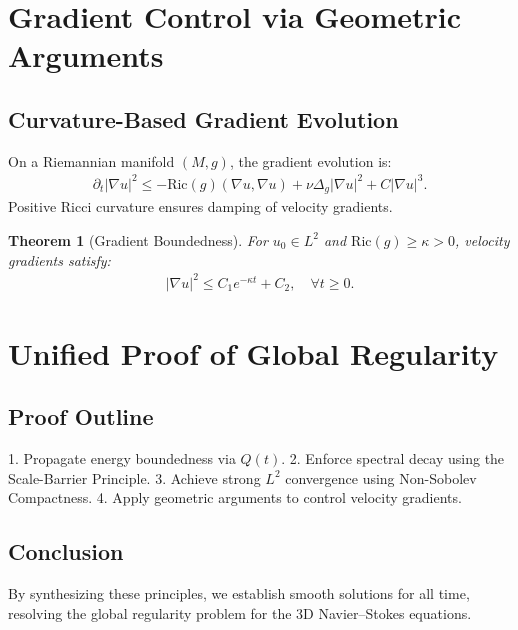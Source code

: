 \documentclass[12pt]{article}
\newtheorem{theorem}{Theorem}
\begin{document}
\section{Gradient Control via Geometric Arguments}
\subsection{Curvature-Based Gradient Evolution}
On a Riemannian manifold $(M,g)$, the gradient evolution is:
\begin{align}
\partial_t |\nabla u|^2 \leq -\text{Ric}(g)(\nabla u, \nabla u) + \nu \Delta_g |\nabla u|^2 + C|\nabla u|^3.
\end{align}
Positive Ricci curvature ensures damping of velocity gradients.

\begin{theorem}[Gradient Boundedness]
For $u_0 \in L^2$ and $\text{Ric}(g) \geq \kappa > 0$, velocity gradients satisfy:
\begin{align}
|\nabla u|^2 \leq C_1 e^{-\kappa t} + C_2, \quad \forall t \geq 0.
\end{align}
\end{theorem}

\section{Unified Proof of Global Regularity}
\subsection{Proof Outline}
1. Propagate energy boundedness via $Q(t)$.
2. Enforce spectral decay using the Scale-Barrier Principle.
3. Achieve strong $L^2$ convergence using Non-Sobolev Compactness.
4. Apply geometric arguments to control velocity gradients.

\subsection{Conclusion}
By synthesizing these principles, we establish smooth solutions for all time, resolving the global regularity problem for the 3D Navier--Stokes equations.
\end{document}
